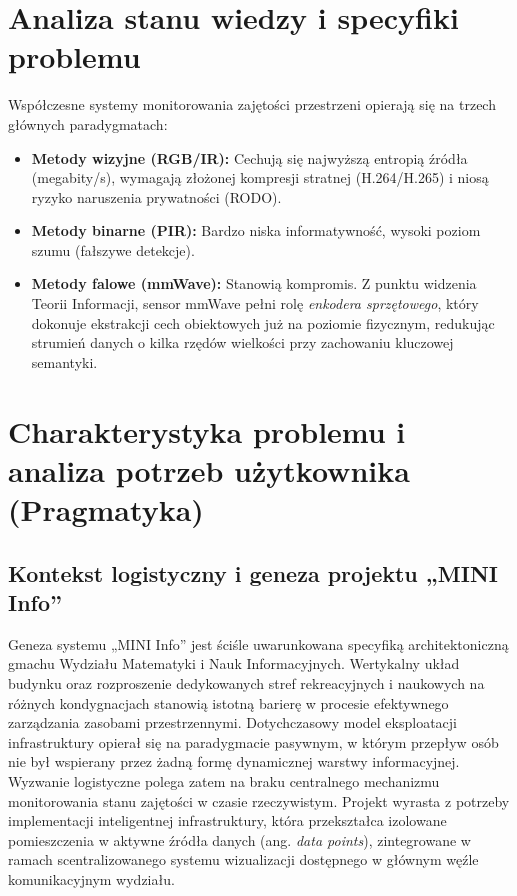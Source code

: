 \documentclass[14pt,a4paper]{extarticle}
\begin{document}
\section{Analiza stanu wiedzy i specyfiki problemu}
Współczesne systemy monitorowania zajętości przestrzeni opierają się na trzech głównych paradygmatach:
\begin{itemize}
    \item \textbf{Metody wizyjne (RGB/IR):} Cechują się najwyższą entropią źródła (megabity/s), wymagają złożonej kompresji stratnej (H.264/H.265) i niosą ryzyko naruszenia prywatności (RODO).
    \item \textbf{Metody binarne (PIR):} Bardzo niska informatywność, wysoki poziom szumu (fałszywe detekcje).
    \item \textbf{Metody falowe (mmWave):} Stanowią kompromis. Z punktu widzenia Teorii Informacji, sensor mmWave pełni rolę \textit{enkodera sprzętowego}, który dokonuje ekstrakcji cech obiektowych już na poziomie fizycznym, redukując strumień danych o kilka rzędów wielkości przy zachowaniu kluczowej semantyki.
\end{itemize}
\section{Charakterystyka problemu i analiza potrzeb użytkownika (Pragmatyka)}

\subsection{Kontekst logistyczny i geneza projektu „MINI Info”}
Geneza systemu „MINI Info” jest ściśle uwarunkowana specyfiką architektoniczną gmachu Wydziału Matematyki i Nauk Informacyjnych. Wertykalny układ budynku oraz rozproszenie dedykowanych stref rekreacyjnych i naukowych na różnych kondygnacjach stanowią istotną barierę w procesie efektywnego zarządzania zasobami przestrzennymi. Dotychczasowy model eksploatacji infrastruktury opierał się na paradygmacie pasywnym, w którym przepływ osób nie był wspierany przez żadną formę dynamicznej warstwy informacyjnej. Wyzwanie logistyczne polega zatem na braku centralnego mechanizmu monitorowania stanu zajętości w czasie rzeczywistym. Projekt wyrasta z potrzeby implementacji inteligentnej infrastruktury, która przekształca izolowane pomieszczenia w aktywne źródła danych (ang. \textit{data points}), zintegrowane w ramach scentralizowanego systemu wizualizacji dostępnego w głównym węźle komunikacyjnym wydziału.
\end{document}
